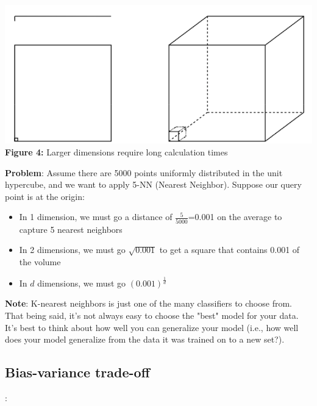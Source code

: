 \documentclass{article}
\begin{document}
\begin{center}
	\includegraphics[scale=0.35]{DimensionalityIssue.png}\\
    \textbf{Figure 4:} Larger dimensions require long calculation times\\
\end{center}

\textbf{Problem}: Assume there are 5000 points uniformly distributed in the unit hypercube, and we want to apply 5-NN (Nearest Neighbor). Suppose our query point is at the origin:
\begin{itemize}
    \item In 1 dimension, we must go a distance of $\frac{5}{5000}$=0.001 on the average to capture 5 nearest neighbors
    \item In 2 dimensions, we must go $\sqrt{0.001}$ to get a square that contains 0.001 of the volume
    \item In $d$ dimensions, we must go $(0.001)^{\frac{1}{d}}$
\end{itemize}



\textbf{Note}: K-nearest neighbors is just one of the many classifiers to choose from. That being said, it's not always easy to choose the "best" model for your data. It's best to think about how well you can generalize your model (i.e., how well does your model generalize from the data it was trained on to a new set?). 




\subsection{Bias-variance trade-off}: 
\end{document}
